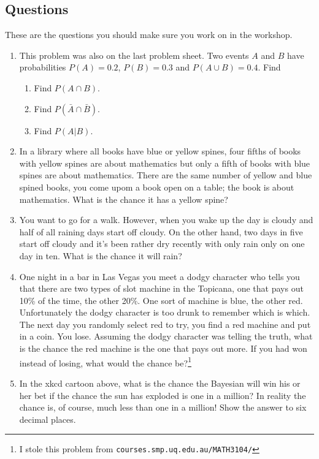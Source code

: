 \documentclass[11pt,a4paper]{scrartcl}
\begin{document}
\subsection*{Questions}

These are the questions you should make sure you work on in the workshop.

\begin{enumerate}

\item This problem was also on the last problem sheet. Two events $A$ and $B$ have probabilities $P(A)=0.2$, $P(B)=0.3$ and $P(A\cup B)=0.4$. Find
\begin{enumerate}
\item Find $P(A\cap B)$.
\item Find $P(\bar{A}\cap \bar{B})$.
\item Find $P(A|B)$.
\end{enumerate}

\item In a library where all books have blue or yellow spines, four
  fifths of books with yellow spines are about mathematics but only a
  fifth of books with blue spines are about mathematics. There are the
  same number of yellow and blue spined books, you come upom a book
  open on a table; the book is about mathematics. What is the chance
  it has a yellow spine?

\item You want to go for a walk. However, when you wake up the day is
  cloudy and half of all raining days start off cloudy. On the other
  hand, two days in five start off cloudy and it's been rather dry
  recently with only rain only on one day in ten. What is the chance
  it will rain?
  
\item One night in a bar in Las Vegas you meet a dodgy character who
  tells you that there are two types of slot machine in the Topicana,
  one that pays out 10\% of the time, the other 20\%. One sort of
  machine is blue, the other red. Unfortunately the dodgy character is
  too drunk to remember which is which. The next day you randomly
  select red to try, you find a red machine and put in a coin. You
  lose. Assuming the dodgy character was telling the truth, what is
  the chance the red machine is the one that pays out more. If you had
  won instead of losing, what would the chance be?\footnote{I stole
    this problem from \texttt{courses.smp.uq.edu.au/MATH3104/}}
  
\item In the xkcd cartoon above, what is the chance the Bayesian will
  win his or her bet if the chance the sun has exploded is one in a
  million? In reality the chance is, of course, much less than one in
  a million! Show the answer to six decimal places.
  
\end{enumerate}
\end{document}
